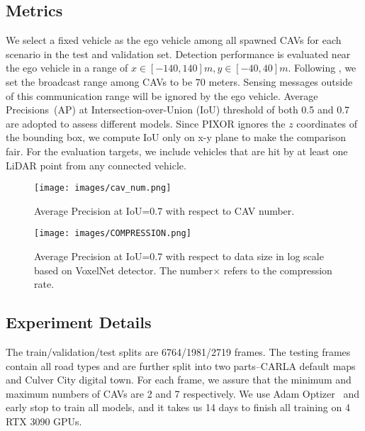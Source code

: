 \subsection{Metrics}
We select a fixed vehicle as the ego vehicle among all spawned CAVs for each scenario in the test and validation set. Detection performance is evaluated near the ego vehicle in a range of $x\in[-140, 140]m, y\in[-40, 40]m$. Following \cite{Wang2020V2VNetVC}, we set the broadcast range among CAVs to be 70 meters. Sensing messages outside of this communication range will be ignored by the ego vehicle. Average Precisions~(AP) at Intersection-over-Union (IoU) threshold of both 0.5 and 0.7 are adopted to assess different models. Since PIXOR ignores the $z$ coordinates of the bounding box, we compute IoU only on x-y plane to make the comparison fair. For the evaluation targets, we include vehicles that are hit by at least one LiDAR point from any connected vehicle. 

\begin{figure}[!t]
\centering
\texttt{[image: images/cav\_num.png]}
\caption{Average Precision at IoU=0.7 with respect to CAV number.}
\label{fig:cav_num}
\end{figure}

\begin{figure}[!t]
\centering
\texttt{[image: images/COMPRESSION.png]}
\caption{Average Precision at IoU=0.7 with respect to data size in log scale based on VoxelNet detector. The number$\times$ refers to the compression rate.}
\label{fig:compression}
\end{figure}
\subsection{Experiment Details}
The train/validation/test splits are 6764/1981/2719 frames. The testing frames contain all road types and are further split into two parts--CARLA default maps and Culver City digital town. For each frame, we assure that the minimum and maximum numbers of CAVs are 2 and 7 respectively. We use Adam Optizer~\cite{kingma2014adam} and early stop to train all models, and it takes us 14 days to finish all training on  4 RTX 3090 GPUs.

